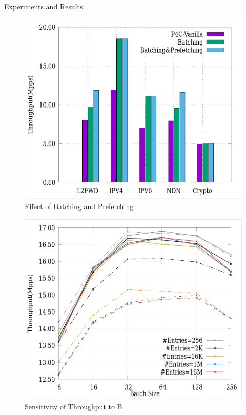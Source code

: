 \documentclass[final]{beamer}
\newlength{\twocolwid}
\begin{document}
\begin{frame}
\begin{columns}[t]
\begin{column}{\twocolwid}
\begin{columns}[t,totalwidth=\twocolwid]
\begin{column}{\twocolwid}
\begin{exampleblock}{Experiments and Results}
\begin{multicols}{3}
\begin{figure}
\includegraphics[width=1\linewidth]{img/batching_and_prefetching}
\caption{Effect of Batching and Prefetching}
\end{figure}

\begin{figure}
\includegraphics[width=1\linewidth]{img/throughput_sensitivity_B}
\caption{Sensitivity of Throughput to B}
\end{figure}


\end{multicols}
\end{exampleblock}
\end{column}
\end{columns}
\end{column}
\end{columns}
\end{frame}
\end{document}
